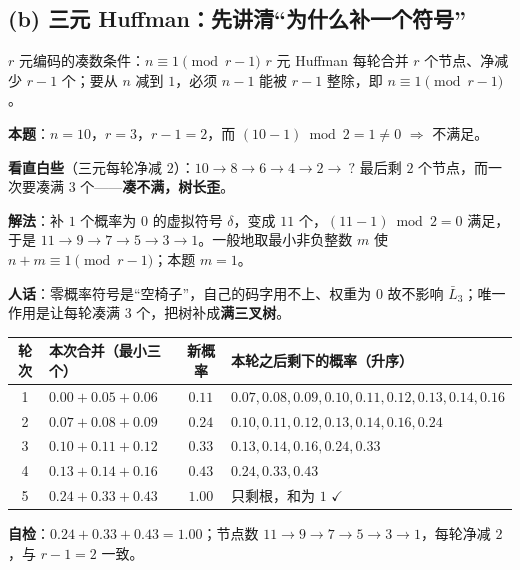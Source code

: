 \documentclass[11pt,a4paper]{ctexart}
\begin{document}
\subsection{(b) 三元 Huffman：先讲清“为什么补一个符号”}

\begin{idea}{$r$ 元编码的凑数条件：$n\equiv1\pmod{r-1}$}
$r$ 元 Huffman 每轮合并 $r$ 个节点、净减少 $r-1$ 个；要从 $n$ 减到 $1$，必须 $n-1$ 能被 $r-1$ 整除，即 $n\equiv1\pmod{r-1}$。

\textbf{本题}：$n=10$，$r=3$，$r-1=2$，而 $(10-1)\bmod2=1\ne0$ $\Rightarrow$ 不满足。

\textbf{看直白些}（三元每轮净减 $2$）：$10\to8\to6\to4\to2\to\ ?$ 最后剩 $2$ 个节点，而一次要凑满 $3$ 个——\textbf{凑不满，树长歪}。

\textbf{解法}：补 $1$ 个概率为 $0$ 的虚拟符号 $\delta$，变成 $11$ 个，$(11-1)\bmod2=0$ 满足，于是 $11\to9\to7\to5\to3\to1$。一般地取最小非负整数 $m$ 使 $n+m\equiv1\pmod{r-1}$；本题 $m=1$。

\textbf{人话}：零概率符号是“空椅子”，自己的码字用不上、权重为 $0$ 故不影响 $\bar L_3$；唯一作用是让每轮凑满 $3$ 个，把树补成\textbf{满三叉树}。
\end{idea}

\begin{center}
\small
\begin{tabular}{@{}c l c l@{}}
\toprule
轮次 & 本次合并（最小三个） & 新概率 & 本轮之后剩下的概率（升序）\\
\midrule
1 & $0.00+0.05+0.06$ & $0.11$ & $0.07,0.08,0.09,0.10,\mathbf{0.11},0.12,0.13,0.14,0.16$\\
2 & $0.07+0.08+0.09$ & $0.24$ & $0.10,0.11,0.12,0.13,0.14,0.16,\mathbf{0.24}$\\
3 & $0.10+0.11+0.12$ & $0.33$ & $0.13,0.14,0.16,0.24,\mathbf{0.33}$\\
4 & $0.13+0.14+0.16$ & $0.43$ & $0.24,0.33,\mathbf{0.43}$\\
5 & $0.24+0.33+0.43$ & $1.00$ & 只剩根，和为 $1$ $\checkmark$\\
\bottomrule
\end{tabular}
\end{center}
\textbf{自检}：$0.24+0.33+0.43=1.00$；节点数 $11\to9\to7\to5\to3\to1$，每轮净减 $2$，与 $r-1=2$ 一致。
\end{document}
